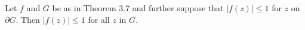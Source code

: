 Let $f$ and $G$ be as in Theorem 3.7 and further suppose that $|f(z)| \leq 1$ for $z$ on $\partial G$. Then $|f(z)| \leq 1$ for all $z$ in $G$.